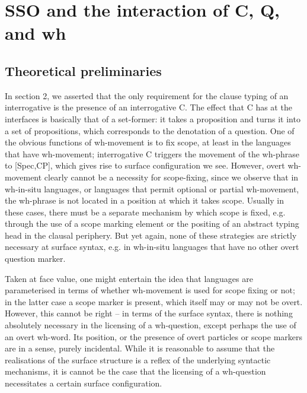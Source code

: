 \documentclass{glossa}
\begin{document}
\section{SSO and the interaction of C, Q, and wh}
\subsection{Theoretical preliminaries}
In section 2, we asserted that the only requirement for the clause typing of an interrogative is the presence of an interrogative C. The effect that C has at the interfaces is basically that of a set-former: it takes a proposition and turns it into a set of propositions, which corresponds to the denotation of a question. One of the obvious functions of wh-movement is to fix scope, at least in the languages that have wh-movement; interrogative C triggers the movement of the wh-phrase to [Spec,CP], which gives rise to surface configuration we see. However, overt wh-movement clearly cannot be a necessity for scope-fixing, since we observe that in wh-in-situ languages, or languages that permit optional or partial wh-movement, the wh-phrase is not located in a position at which it takes scope. Usually in these cases, there must be a separate mechanism by which scope is fixed, e.g. through the use of a scope marking element or the positing of an abstract typing head in the clausal periphery. But yet again, none of these strategies are strictly necessary at surface syntax, e.g. in wh-in-situ languages that have no other overt question marker.

Taken at face value, one might entertain the idea that languages are parameterised in terms of whether wh-movement is used for scope fixing or not; in the latter case a scope marker is present, which itself may or may not be overt. However, this cannot be right -- in terms of the surface syntax, there is nothing absolutely necessary in the licensing of a wh-question, except perhaps the use of an overt wh-word. Its position, or the presence of overt particles or scope markers are in a sense, purely incidental. While it is reasonable to assume that the realisations of the surface structure is a reflex of the underlying syntactic mechanisms, it is cannot be the case that the licensing of a wh-question necessitates a certain surface configuration.
\end{document}
